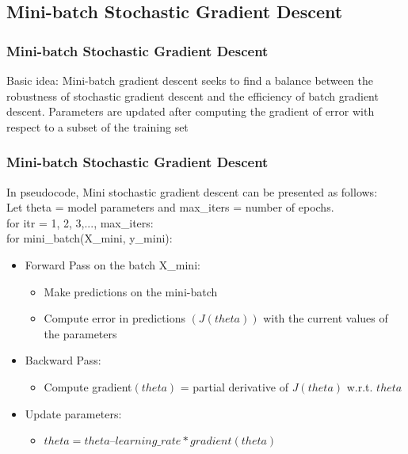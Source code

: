 \documentclass[cjk]{beamer}
\begin{document}
\subsection{Mini-batch Stochastic Gradient Descent}

\begin{frame}
\frametitle{Mini-batch Stochastic Gradient Descent}
	\begin{block}{Basic idea:}
	Mini-batch gradient descent seeks to find a balance between the robustness of stochastic gradient descent and the efficiency of batch gradient descent. Parameters are updated after computing the gradient of error with respect to a subset of the training set
	\end{block}
\end{frame}

\begin{frame}
\frametitle{Mini-batch Stochastic Gradient Descent}
In pseudocode, Mini stochastic gradient descent can be presented as follows:\\
Let theta = model parameters and max\_iters = number of epochs.\\
for itr = 1, 2, 3,..., max\_iters:\\
\quad for mini\_batch(X\_mini, y\_mini):
	\begin{itemize}
	\item Forward Pass on the batch X\_mini:
		\begin{itemize}
		\item Make predictions on the mini-batch
		\item Compute error in predictions $(J(theta))$ with the current values of the parameters
		\end{itemize}
	\end{itemize}
	\begin{itemize}
	\item Backward Pass:
		\begin{itemize}
		\item Compute gradient$(theta)$ = partial derivative of $J(theta)$ w.r.t. $theta$
		\end{itemize}
	\end{itemize}
	\begin{itemize}
	\item Update parameters:
		\begin{itemize}
		\item $theta = theta – learning\_rate*gradient(theta)$
		\end{itemize}
	\end{itemize}
\end{frame}
\end{document}

